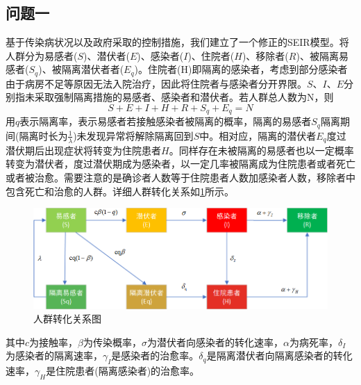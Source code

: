 \documentclass[withoutpre]{cumcmthesis} %
\begin{document}
\subsection{问题一}
基于传染病状况以及政府采取的控制措施，我们建立了一个修正的SEIR模型。将人群分为易感者($S$)、潜伏者($E$)、感染者($I$)、住院者($H$)、移除者($R$)、被隔离易感者($S_q$)、被隔离潜伏者者($E_q$)。住院者(H)即隔离的感染者，考虑到部分感染者由于病房不足等原因无法入院治疗，因此将住院者与感染者分开界限。$S$、$I$、$E$分别指未采取强制隔离措施的易感者、感染者和潜伏者。若人群总人数为N，则
\begin{equation}
    S + E + I + H + R + S_q + E_q = N
\end{equation}
用$q$表示隔离率，表示易感者若接触感染者被隔离的概率，隔离的易感者$S_q$隔离期间(隔离时长为$\frac{1}{\lambda}$)未发现异常将解除隔离回到$S$中。相对应，隔离的潜伏者$E_q$度过潜伏期后出现症状将转变为住院患者$H$。同样存在未被隔离的易感者也以一定概率转变为潜伏者，度过潜伏期成为感染者，以一定几率被隔离成为住院患者或者死亡或者被治愈。需要注意的是确诊者人数等于住院患者人数加感染者人数，移除者中包含死亡和治愈的人群。详细人群转化关系如\cref{fig:transmission}所示。
\begin{figure}[H]
    \centering
    \includegraphics[width=\textwidth]{figures/transmission.png}
    \caption{人群转化关系图}
    \label{fig:transmission}
\end{figure}

其中$c$为接触率，$\beta$为传染概率，$\sigma$为潜伏者向感染者的转化速率，$\alpha$为病死率，$\delta_I$为感染者的隔离速率，$\gamma_I$是感染者的治愈率。$\delta_q$是隔离潜伏者向隔离感染者的转化速率，$\gamma_H$是住院患者(隔离感染者)的治愈率。
\end{document}
